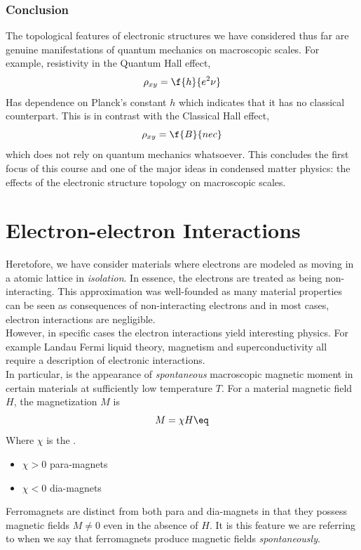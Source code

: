 \documentclass{article}
\begin{document}
\subsubsection{Conclusion}

The topological features of electronic structures we have considered thus far are genuine manifestations of quantum mechanics on macroscopic scales. For example, resistivity in the Quantum Hall effect,
\[ \rho_{xy} = \f{h}{e^2 \nu} \]
Has dependence on Planck's constant $h$ which indicates that it has no classical counterpart. This is in contrast with the Classical Hall effect,
\[ \rho_{xy} = \f{B}{nec} \]
which does not rely on quantum mechanics whatsoever. This concludes the first focus of this course and one of the major ideas in condensed matter physics: the effects of the electronic structure topology on macroscopic scales. \\

\section{Electron-electron Interactions}

Heretofore, we have consider materials where electrons are modeled as moving in a atomic lattice in \textit{isolation}. In essence, the electrons are treated as being non-interacting. This approximation was well-founded as many material properties can be seen as consequences of non-interacting electrons and in most cases, electron interactions are negligible. \\

However, in specific cases the electron interactions yield interesting physics. For example Landau Fermi liquid theory, magnetism and superconductivity all require a description of electronic interactions. \\

In particular,  is the appearance of \textit{spontaneous} macroscopic magnetic moment in certain materials at sufficiently low temperature $T$. For a material magnetic field $H$, the magnetization $M$ is
\[ M = \chi H \eq \label{eq:linear_susceptibility}\]
Where $\chi$ is the .
\begin{itemize}
    \item $\chi > 0$ para-magnets
    \item $\chi < 0$ dia-magnets
\end{itemize}
Ferromagnets are distinct from both para and dia-magnets in that they possess magnetic fields $M \neq 0$ even in the absence of $H$. It is this feature we are referring to when we say that ferromagnets produce magnetic fields \textit{spontaneously}. \\
\end{document}
